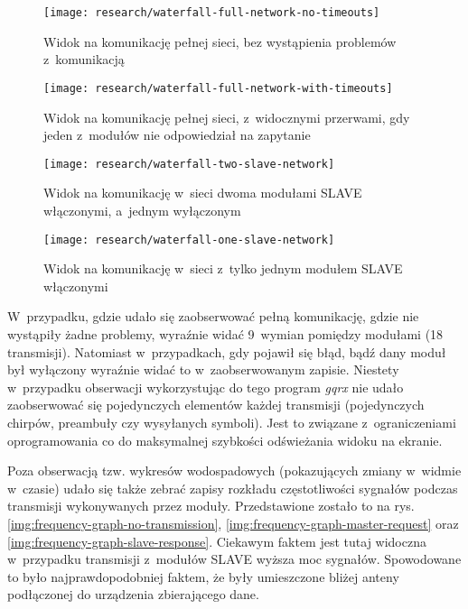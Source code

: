 \begin{figure}[!htbp]
    \centering
    \texttt{[image: research/waterfall-full-network-no-timeouts]}
    \caption{\label{img:waterfall-full-no-timeouts}Widok na komunikację pełnej sieci, bez wystąpienia problemów
        z~komunikacją}
\end{figure}

\begin{figure}[!htbp]
    \centering
    \texttt{[image: research/waterfall-full-network-with-timeouts]}
    \caption{\label{img:waterfall-full-with-timeouts}Widok na komunikację pełnej sieci, z~widocznymi przerwami, gdy
        jeden z~modułów nie odpowiedział na zapytanie}
\end{figure}

\begin{figure}[!htbp]
    \centering
    \texttt{[image: research/waterfall-two-slave-network]}
    \caption{\label{img:waterfall-one-slave}Widok na komunikację w~sieci dwoma modułami SLAVE włączonymi, a~jednym
        wyłączonym}
\end{figure}

\begin{figure}[!htbp]
    \centering
    \texttt{[image: research/waterfall-one-slave-network]}
    \caption{\label{img:waterfall-two-slave}Widok na komunikację w~sieci z~tylko jednym modułem SLAVE włączonymi}
\end{figure}

\FloatBarrier
W~przypadku, gdzie udało się zaobserwować pełną komunikację, gdzie nie wystąpiły żadne problemy, wyraźnie widać 9~wymian
pomiędzy modułami (18 transmisji). Natomiast w~przypadkach, gdy pojawił się błąd, bądź dany moduł był wyłączony wyraźnie
widać to w~zaobserwowanym zapisie. Niestety w~przypadku obserwacji wykorzystując do tego program \textsl{gqrx} nie udało
zaobserwować się pojedynczych elementów każdej transmisji (pojedynczych chirpów, preambuły czy wysyłanych symboli). Jest
to związane z~ograniczeniami oprogramowania co do maksymalnej szybkości odświeżania widoku na ekranie.

Poza obserwacją tzw. wykresów wodospadowych (pokazujących zmiany w~widmie w~czasie) udało się także zebrać zapisy
rozkładu częstotliwości sygnałów podczas transmisji wykonywanych przez moduły. Przedstawione zostało to na rys.
\ref{img:frequency-graph-no-transmission}, \ref{img:frequency-graph-master-request} oraz
\ref{img:frequency-graph-slave-response}. Ciekawym faktem jest tutaj widoczna w~przypadku transmisji z~modułów SLAVE
wyższa moc sygnałów. Spowodowane to było najprawdopodobniej faktem, że były umieszczone bliżej anteny podłączonej do
urządzenia zbierającego dane.

